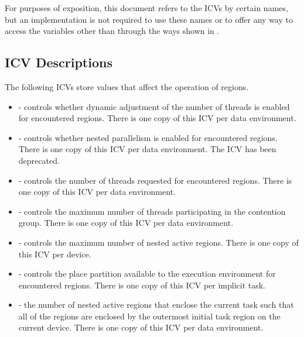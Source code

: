 For purposes of exposition, this document refers to the ICVs by certain names, but an
implementation is not required to use these names or to offer any way to access the
variables other than through the ways shown in
.








\subsection{ICV Descriptions}
\label{subsec:ICV Descriptions}
The following ICVs store values that affect the operation of  regions.

\begin{itemize}
\item {} - controls whether dynamic adjustment of the number of threads 
      is enabled for encountered  regions. There is one copy of this 
      ICV per data environment.

\item {} - controls whether nested parallelism is enabled for encountered 
       regions. There is one copy of this ICV per data environment. 
      The  ICV has been deprecated.

\item {} - controls the number of threads requested for encountered 
       regions. There is one copy of this ICV per data environment.

\item {} - controls the maximum number of threads participating 
      in the contention group. There is one copy of this ICV per data environment.

\item {} - controls the maximum number of nested active 
       regions. There is one copy of this ICV per device.

\item {} - controls the place partition available to the 
      execution environment for encountered  regions. There is one 
      copy of this ICV per implicit task.

\item {} - the number of nested active  regions 
      that enclose the current task such that all of the  regions are 
      enclosed by the outermost initial task region on the current device. There is 
      one copy of this ICV per data environment.


\end{itemize}
